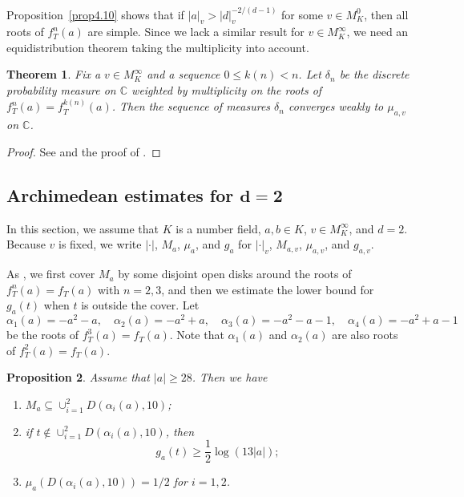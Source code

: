 \documentclass[11pt]{amsart}
\numberwithin{equation}{section}
\theoremstyle{plain}
\newtheorem{thm}{Theorem}[section]
\newtheorem{prop}[thm]{Proposition}
\theoremstyle{definition}
\theoremstyle{remark}
\newcommand{\C}{\mathbb C}
\begin{document}
Proposition~\ref{prop4.10} shows that if $|a|_{v}>|d|_{v}^{-2/(d-1)}$
for some $v\in M_{K}^{0}$, then all roots of $f_{T}^{n}(a)$ are
simple. Since we lack a similar result for $v\in M_{K}^{\infty}$,
we need an equidistribution theorem taking the multiplicity into account.

\begin{thm}\label{thm4.3}
Fix a $v\in M_{K}^{\infty}$ and a sequence $0\leq k(n)<n$.
Let $\delta_{n}$ be the discrete probability measure on $\C$
weighted by multiplicity on the roots of $f_{T}^{n}(a)=f_{T}^{k(n)}(a)$.
Then the sequence of measures $\delta_{n}$ converges weakly to $\mu_{a,v}$
on $\C$.
\end{thm}

\begin{proof}
See \cite[Section 4.3]{BD1} and the proof of \cite[Theorem 1]{DF}.
\end{proof}

\subsection{Archimedean estimates for \texorpdfstring{$\boldsymbol{d=2}$}{$d=2$}}\label{sec4.2}

In this section, we assume that $K$ is a number field, $a,b\in K$,
$v\in M_{K}^{\infty}$, and $d=2$. Because $v$ is fixed, we write
$|\cdot|$, $M_{a}$, $\mu_{a}$, and $g_{a}$ for $|\cdot|_{v}$,
$M_{a,v}$, $\mu_{a,v}$, and $g_{a,v}$.

As \cite[Section 3.2]{DKY2}, we first cover $M_{a}$ by some disjoint
open disks around the roots of $f_{T}^{n}(a)=f_{T}(a)$ with $n=2,3$,
and then we estimate the lower bound for $g_{a}(t)$ when $t$ is outside
the cover. Let
\[
\alpha_{1}(a)=-a^{2}-a,\quad\alpha_{2}(a)=-a^{2}+a,\quad\alpha_{3}(a)=-a^{2}-a-1,\quad\alpha_{4}(a)=-a^{2}+a-1
\]
be the roots of $f_{T}^{3}(a)=f_{T}(a)$. Note that $\alpha_{1}(a)$
and $\alpha_{2}(a)$ are also roots of $f_{T}^{2}(a)=f_{T}(a)$.

\begin{prop}\label{prop4.4}
  Assume that $|a|\geq28$. Then we have
\begin{enumerate}
\item\label{p4.4-1} $M_{a}\subseteq\cup_{i=1}^{2}D(\alpha_{i}(a),10)$; 
\item\label{p4.4-2} if $t\notin\cup_{i=1}^{2}D(\alpha_{i}(a),10)$, then
\[
g_{a}(t)\geq\frac{1}{2}\log(13|a|);
\]
\item\label{p4.4-3} $\mu_{a}(D(\alpha_{i}(a),10))=1/2$ for $i=1,2$.
\end{enumerate}
\end{prop}
\end{document}
